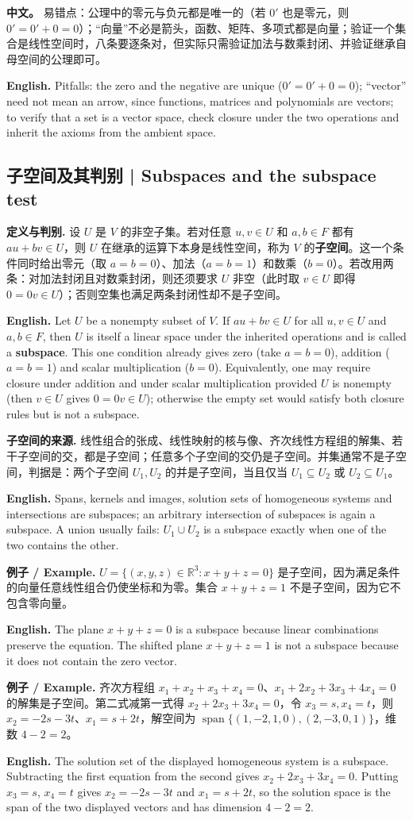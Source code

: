 \documentclass[UTF8,11pt,a4paper]{ctexart}
\newcommand{\EN}[1]{\par\noindent\textbf{English.} #1\par}
\newcommand{\EX}[2]{\par\noindent\textbf{例子 / Example.} #1\par\EN{#2}}
\newcommand{\APS}[2]{\par\noindent\textbf{中文。} #1\par\noindent\textbf{English.} #2\par\smallskip}
\begin{document}
\APS{易错点：公理中的零元与负元都是唯一的（若 $0'$ 也是零元，则 $0'=0'+0=0$）；“向量”不必是箭头，函数、矩阵、多项式都是向量；验证一个集合是线性空间时，八条要逐条对，但实际只需验证加法与数乘封闭、并验证继承自母空间的公理即可。}{Pitfalls: the zero and the negative are unique ($0'=0'+0=0$); ``vector'' need not mean an arrow, since functions, matrices and polynomials are vectors; to verify that a set is a vector space, check closure under the two operations and inherit the axioms from the ambient space.}

\subsection{子空间及其判别 | Subspaces and the subspace test}
\noindent\textbf{定义与判别.} 设 $U$ 是 $V$ 的非空子集。若对任意 $u,v\in U$ 和 $a,b\in F$ 都有 $au+bv\in U$，则 $U$ 在继承的运算下本身是线性空间，称为 $V$ 的\textbf{子空间}。这一个条件同时给出零元（取 $a=b=0$）、加法（$a=b=1$）和数乘（$b=0$）。若改用两条：对加法封闭且对数乘封闭，则还须要求 $U$ 非空（此时取 $v\in U$ 即得 $0=0v\in U$）；否则空集也满足两条封闭性却不是子空间。
\EN{Let $U$ be a nonempty subset of $V$. If $au+bv\in U$ for all $u,v\in U$ and $a,b\in F$, then $U$ is itself a linear space under the inherited operations and is called a \textbf{subspace}. This one condition already gives zero (take $a=b=0$), addition ($a=b=1$) and scalar multiplication ($b=0$). Equivalently, one may require closure under addition and under scalar multiplication provided $U$ is nonempty (then $v\in U$ gives $0=0v\in U$); otherwise the empty set would satisfy both closure rules but is not a subspace.}
\noindent\textbf{子空间的来源.} 线性组合的张成、线性映射的核与像、齐次线性方程组的解集、若干子空间的交，都是子空间；任意多个子空间的交仍是子空间。并集通常不是子空间，判据是：两个子空间 $U_1,U_2$ 的并是子空间，当且仅当 $U_1\subseteq U_2$ 或 $U_2\subseteq U_1$。
\EN{Spans, kernels and images, solution sets of homogeneous systems and intersections are subspaces; an arbitrary intersection of subspaces is again a subspace. A union usually fails: $U_1\cup U_2$ is a subspace exactly when one of the two contains the other.}
\EX{$U=\{(x,y,z)\in\mathbb R^3:x+y+z=0\}$ 是子空间，因为满足条件的向量任意线性组合仍使坐标和为零。集合 $x+y+z=1$ 不是子空间，因为它不包含零向量。}{The plane $x+y+z=0$ is a subspace because linear combinations preserve the equation. The shifted plane $x+y+z=1$ is not a subspace because it does not contain the zero vector.}
\EX{齐次方程组 $x_1+x_2+x_3+x_4=0$、$x_1+2x_2+3x_3+4x_4=0$ 的解集是子空间。第二式减第一式得 $x_2+2x_3+3x_4=0$，令 $x_3=s,x_4=t$，则 $x_2=-2s-3t$、$x_1=s+2t$，解空间为 $\operatorname{span}\{(1,-2,1,0),(2,-3,0,1)\}$，维数 $4-2=2$。}{The solution set of the displayed homogeneous system is a subspace. Subtracting the first equation from the second gives $x_2+2x_3+3x_4=0$. Putting $x_3=s$, $x_4=t$ gives $x_2=-2s-3t$ and $x_1=s+2t$, so the solution space is the span of the two displayed vectors and has dimension $4-2=2$.}
\end{document}
